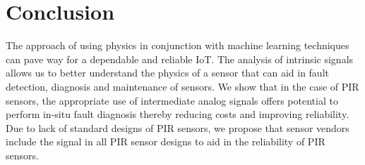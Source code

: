


\section{Conclusion} 
\label{sec:concl}
The approach of using physics in conjunction with machine learning techniques can pave way for a dependable and reliable IoT. The analysis of intrinsic signals allows us to better understand the physics of a sensor that can aid in fault detection, diagnosis and maintenance of sensors. We show that in the case of PIR sensors, the appropriate use of intermediate analog signals offers potential to perform in-situ fault diagnosis thereby reducing costs and improving reliability. Due to lack of standard designs of PIR sensors, we propose that sensor vendors include the \aout signal in all PIR sensor designs to aid in the reliability of PIR sensors.